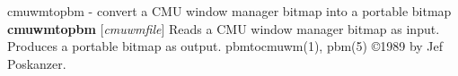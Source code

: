 %

\newpage
%

cmuwmtopbm - convert a CMU window manager bitmap into a portable bitmap
{\bf cmuwmtopbm}
{\rm [}{\it cmuwmfile}{\rm ]}
Reads a CMU window manager bitmap as input.
Produces a portable bitmap as output.
pbmtocmuwm(1), pbm(5)
\copyright 1989 by Jef Poskanzer.
%
 
%

\newpage
%

